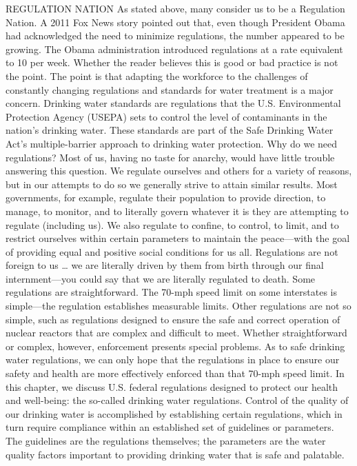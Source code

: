 \documentclass{article}
\begin{document}
REGULATION NATION As stated above, many consider us to be a Regulation
Nation. A 2011 Fox News story pointed out that, even though President
Obama had acknowledged the need to minimize regulations, the number
appeared to be growing. The Obama administration introduced regulations
at a rate equivalent to 10 per week. Whether the reader believes this is
good or bad practice is not the point. The point is that adapting the
workforce to the challenges of constantly changing regulations and
standards for water treatment is a major concern. Drinking water
standards are regulations that the U.S. Environmental Protection Agency
(USEPA) sets to control the level of contaminants in the nation's
drinking water. These standards are part of the Safe Drinking Water
Act's multiple-barrier approach to drinking water protection. Why do we
need regulations? Most of us, having no taste for anarchy, would have
little trouble answering this question. We regulate ourselves and others
for a variety of reasons, but in our attempts to do so we generally
strive to attain similar results. Most governments, for example,
regulate their population to provide direction, to manage, to monitor,
and to literally govern whatever it is they are attempting to regulate
(including us). We also regulate to confine, to control, to limit, and
to restrict ourselves within certain parameters to maintain the
peace---with the goal of providing equal and positive social conditions
for us all. Regulations are not foreign to us \ldots{} we are literally
driven by them from birth through our final internment---you could say
that we are literally regulated to death. Some regulations are
straightforward. The 70-mph speed limit on some interstates is
simple---the regulation establishes measurable limits. Other regulations
are not so simple, such as regulations designed to ensure the safe and
correct operation of nuclear reactors that are complex and difficult to
meet. Whether straightforward or complex, however, enforcement presents
special problems. As to safe drinking water regulations, we can only
hope that the regulations in place to ensure our safety and health are
more effectively enforced than that 70-mph speed limit. In this chapter,
we discuss U.S. federal regulations designed to protect our health and
well-being: the so-called drinking water regulations. Control of the
quality of our drinking water is accomplished by establishing certain
regulations, which in turn require compliance within an established set
of guidelines or parameters. The guidelines are the regulations
themselves; the parameters are the water quality factors important to
providing drinking water that is safe and palatable.
\end{document}
